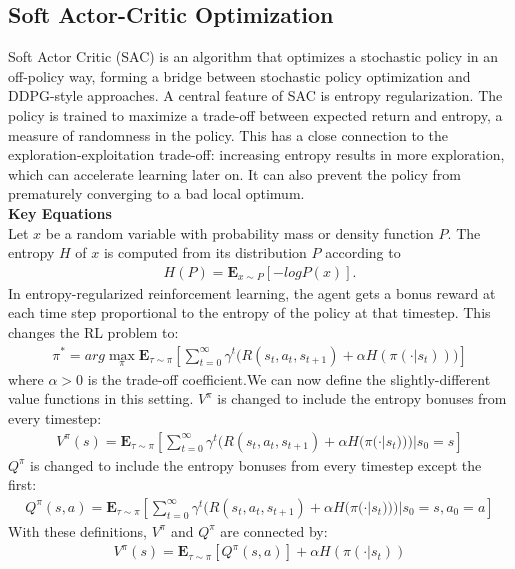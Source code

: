 \documentclass[12pt,a4paper,oneside]{book}
\theoremstyle{plain}
\numberwithin{equation}{chapter} \DeclareMathOperator{\Var}{Var}
\begin{document}
\subsection{Soft Actor-Critic Optimization}\label{Sec2.4.2}
Soft Actor Critic (SAC) is an algorithm that optimizes a stochastic policy in an off-policy way, forming a bridge between stochastic policy optimization and DDPG-style approaches. A central feature of SAC is entropy regularization. The policy is trained to maximize a trade-off between expected return and entropy, a measure of randomness in the policy. This has a close connection to the exploration-exploitation trade-off: increasing entropy results in more exploration, which can accelerate learning later on. It can also prevent the policy from prematurely converging to a bad local optimum.\\
\textbf{Key Equations}\\
Let $x$ be a random variable with probability mass or density function $P$. The entropy $H$ of $x$ is computed from its distribution $P$ according to
\begin{align*}
    H(P)=\mathbf{E}_{x\sim P}[-logP(x)].
\end{align*}
In entropy-regularized reinforcement learning, the agent gets a bonus reward at each time step proportional to the entropy of the policy at that timestep. This changes the RL problem to:
\begin{align*}
    \pi^{\ast}=arg \max_{\pi}\mathbf{E}_{\tau \sim \pi}\left[\sum^{\infty}_{t=0} \gamma^t \Big (R(s_t,a_t,s_{t+1})+\alpha H(\pi(\cdot|s_t))  \Big) \right]
\end{align*}
where $\alpha > 0$ is the trade-off coefficient.We can now define the slightly-different value functions in this setting. $ V^{\pi} $ is changed to include the entropy bonuses from every timestep:
\begin{align*}
     V^{\pi}(s)= \mathbf{E}_{\tau \sim \pi}\left[\sum^{\infty}_{t=0} \gamma^t \Big (R(s_t,a_t,s_{t+1})+\alpha H(\pi(\cdot|s_t))  \Big)|s_0=s \right]
\end{align*}
$Q^{\pi}$ is changed to include the entropy bonuses from every timestep except the first:
\begin{align*}
     Q^{\pi}(s,a)= \mathbf{E}_{\tau \sim \pi}\left[\sum^{\infty}_{t=0} \gamma^t \Big (R(s_t,a_t,s_{t+1})+\alpha H(\pi(\cdot|s_t))  \Big)|s_0=s,a_0=a \right]
\end{align*}
With these definitions, $V^{\pi}$ and $Q^{\pi}$ are connected by:
\begin{align*}
     V^{\pi}(s)= \mathbf{E}_{\tau \sim \pi}[Q^{\pi}(s,a)]+\alpha H(\pi(\cdot|s_t))
\end{align*}
\end{document}
